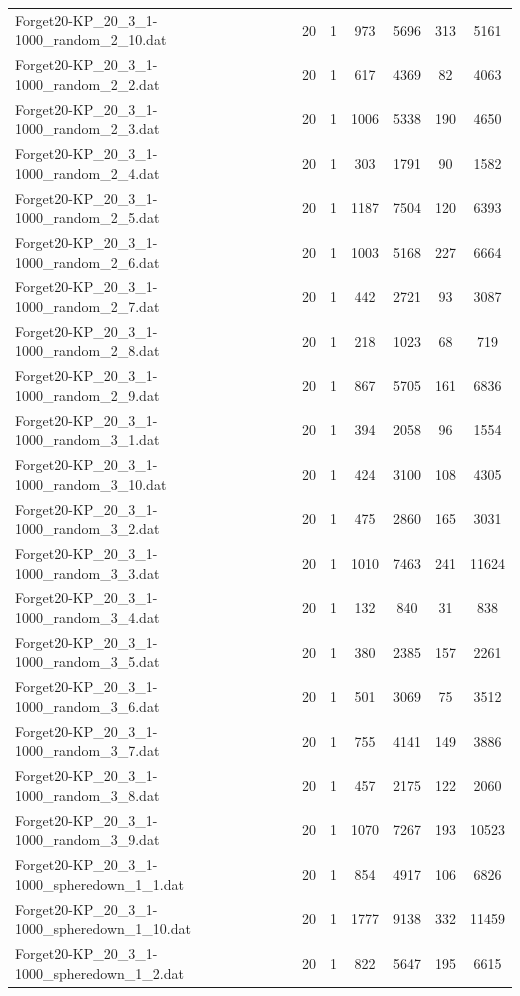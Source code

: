 \begin{table}[!ht]
\begin{tabular}{lcccccc}
Forget20-KP\_20\_3\_1-1000\_random\_2\_10.dat & 20 & 1 & 973 & 5696 & 313 & 5161 \\
Forget20-KP\_20\_3\_1-1000\_random\_2\_2.dat & 20 & 1 & 617 & 4369 & 82 & 4063 \\
Forget20-KP\_20\_3\_1-1000\_random\_2\_3.dat & 20 & 1 & 1006 & 5338 & 190 & 4650 \\
Forget20-KP\_20\_3\_1-1000\_random\_2\_4.dat & 20 & 1 & 303 & 1791 & 90 & 1582 \\
Forget20-KP\_20\_3\_1-1000\_random\_2\_5.dat & 20 & 1 & 1187 & 7504 & 120 & 6393 \\
Forget20-KP\_20\_3\_1-1000\_random\_2\_6.dat & 20 & 1 & 1003 & 5168 & 227 & 6664 \\
Forget20-KP\_20\_3\_1-1000\_random\_2\_7.dat & 20 & 1 & 442 & 2721 & 93 & 3087 \\
Forget20-KP\_20\_3\_1-1000\_random\_2\_8.dat & 20 & 1 & 218 & 1023 & 68 & 719 \\
Forget20-KP\_20\_3\_1-1000\_random\_2\_9.dat & 20 & 1 & 867 & 5705 & 161 & 6836 \\
Forget20-KP\_20\_3\_1-1000\_random\_3\_1.dat & 20 & 1 & 394 & 2058 & 96 & 1554 \\
Forget20-KP\_20\_3\_1-1000\_random\_3\_10.dat & 20 & 1 & 424 & 3100 & 108 & 4305 \\
Forget20-KP\_20\_3\_1-1000\_random\_3\_2.dat & 20 & 1 & 475 & 2860 & 165 & 3031 \\
Forget20-KP\_20\_3\_1-1000\_random\_3\_3.dat & 20 & 1 & 1010 & 7463 & 241 & 11624 \\
Forget20-KP\_20\_3\_1-1000\_random\_3\_4.dat & 20 & 1 & 132 & 840 & 31 & 838 \\
Forget20-KP\_20\_3\_1-1000\_random\_3\_5.dat & 20 & 1 & 380 & 2385 & 157 & 2261 \\
Forget20-KP\_20\_3\_1-1000\_random\_3\_6.dat & 20 & 1 & 501 & 3069 & 75 & 3512 \\
Forget20-KP\_20\_3\_1-1000\_random\_3\_7.dat & 20 & 1 & 755 & 4141 & 149 & 3886 \\
Forget20-KP\_20\_3\_1-1000\_random\_3\_8.dat & 20 & 1 & 457 & 2175 & 122 & 2060 \\
Forget20-KP\_20\_3\_1-1000\_random\_3\_9.dat & 20 & 1 & 1070 & 7267 & 193 & 10523 \\
Forget20-KP\_20\_3\_1-1000\_spheredown\_1\_1.dat & 20 & 1 & 854 & 4917 & 106 & 6826 \\
Forget20-KP\_20\_3\_1-1000\_spheredown\_1\_10.dat & 20 & 1 & 1777 & 9138 & 332 & 11459 \\
Forget20-KP\_20\_3\_1-1000\_spheredown\_1\_2.dat & 20 & 1 & 822 & 5647 & 195 & 6615 \\

\end{tabular}
\end{table}
